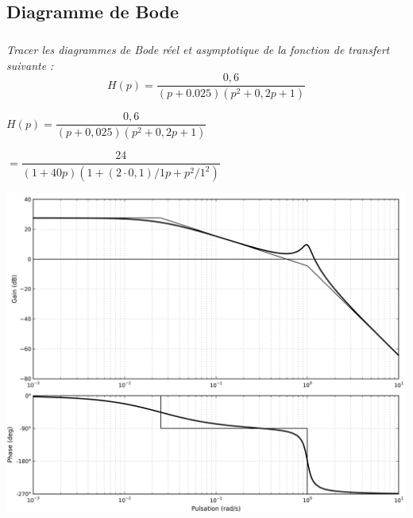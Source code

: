 \documentclass[10pt,fleqn]{article} %
\begin{document}

\vspace{6cm}
\pagestyle{fancy}
\thispagestyle{plain}

\def\columnseprulecolor{\color{ocre}}
\setlength{\columnseprule}{0.4pt} 


\begin{multicols}{2}

\section*{Diagramme de Bode}
\subparagraph{}
\textit{Tracer les diagrammes de Bode réel et asymptotique de la fonction de transfert suivante : }
$$
H(p)=\dfrac{0,6}{(p+0.025)(p^2+0,2p+1)}
$$

\ifprof
\begin{corrige}
$H(p)=\dfrac{0,6}{(p+0,025)(p^2+0,2p+1)}$ 

$=\dfrac{24}{(1+40p)(1+(2\cdot 0,1)/1 p+p^2/1^2)}$
\end{corrige}
\begin{center}
\includegraphics[width=\linewidth]{images/cor_01}
\end{center}


\end{multicols}
\end{document}
